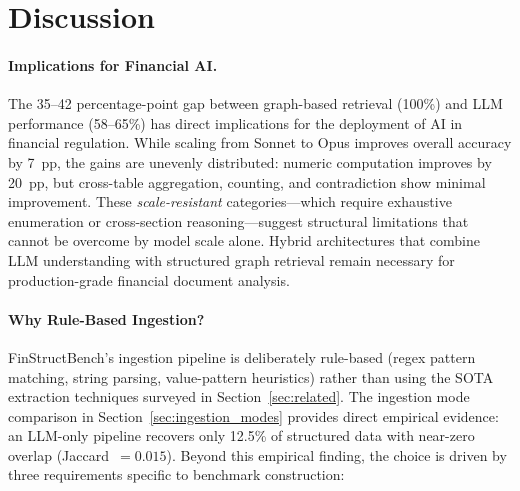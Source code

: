 \documentclass[11pt]{article}
\begin{document}
\section{Discussion}
\label{sec:discussion}

\paragraph{Implications for Financial AI.}
The 35--42 percentage-point gap between graph-based retrieval (100\%)
and LLM performance (58--65\%) has direct implications for the deployment
of AI in financial regulation.  While scaling from Sonnet to Opus
improves overall accuracy by 7~pp, the gains are unevenly distributed:
numeric computation improves by 20~pp, but cross-table aggregation,
counting, and contradiction show minimal improvement.  These
\emph{scale-resistant} categories---which require exhaustive enumeration
or cross-section reasoning---suggest structural limitations that cannot
be overcome by model scale alone.  Hybrid architectures that combine
LLM understanding with structured graph retrieval remain necessary
for production-grade financial document analysis.

\paragraph{Why Rule-Based Ingestion?}
FinStructBench's ingestion pipeline is deliberately rule-based (regex
pattern matching, string parsing, value-pattern heuristics) rather
than using the SOTA extraction techniques surveyed in
Section~\ref{sec:related}.  The ingestion mode comparison in
Section~\ref{sec:ingestion_modes} provides direct empirical evidence:
an LLM-only pipeline recovers only 12.5\% of structured data with
near-zero overlap (Jaccard~$= 0.015$).  Beyond this empirical
finding, the choice is driven by three requirements specific to
benchmark construction:
\end{document}
